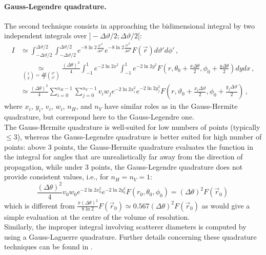 \paragraph{Gauss-Legendre quadrature.} The second technique consists in approaching the bidimensional integral by two independent integrals over $]-\Delta\vartheta/2;\Delta\vartheta/2[$:
\begin{align}
I&\simeq\int_{-\Delta\vartheta/2}^{\Delta\vartheta/2}\int_{-\Delta\vartheta/2}^{\Delta\vartheta/2}e^{-8\ln2\frac{\vartheta'^2}{\Delta\vartheta^2}}e^{-8\ln2\frac{\phi'^2}{\Delta\vartheta^2}}F(\vec r)d\vartheta'd\phi'\,,\\
&\underset{\binom xy=\frac{\Delta\theta}2\binom{\vartheta'}{\phi'}}\simeq\frac{(\Delta\theta)^2}4\int_{-1}^1 e^{-2\ln2x^2}\int_{-1}^1 e^{-2\ln2y^2}F\left(r,\theta_0+\frac{x\Delta\theta}2,\phi_0+\frac{y\Delta\theta}2\right)d yd x\,,\\
&\simeq\frac{(\Delta\theta)^2}4\sum_{i=0}^{n_H-1}\sum_{j=0}^{n_V-1}v_iw_j e^{-2\ln2x_i^2}e^{-2\ln2y_j^2}F\left(r,\vartheta_0+\frac{x_i\Delta\vartheta}2,\phi_0+\frac{y_j\Delta\vartheta}2\right)\,,
\end{align}
where $x_i$, $y_i$, $v_i$, $w_i$, $n_H$, and $n_V$ have similar roles as in the Gauss-Hermite quadrature, but correspond here to the Gauss-Legendre one.\\


The Gauss-Hermite quadrature is well-suited for low numbers of points (typically $\le3$), whereas the Gauss-Legendre quadrature is better suited for high number of points: above 3 points, the Gauss-Hermite quadrature evaluates the function in the integral for angles that are unrealistically far away from the direction of propagation, while under 3 points, the Gauss-Legendre quadrature does not provide consistent values, i.e., for $n_H=n_V=1$:
\begin{equation}
\frac{(\Delta\theta)^2}4v_0w_0 e^{-2\ln2x_0^2}e^{-2\ln2y_0^2}F\left(r_0,\theta_0,\phi_0\right)=(\Delta\theta)^2F\left(\vec r_0\right)\,
\end{equation}
which is different from $\frac{\pi(\Delta\theta)^2}{8\ln2}F\left(\vec r_0\right)\simeq0.567(\Delta\theta)^2F\left(\vec r_0\right)$ as would give a simple evaluation at the centre of the volume of resolution.\\


Similarly, the improper integral involving scatterer diameters is computed by using a Gauss-Laguerre quadrature. Further details concerning these quadrature techniques can be found in \citet{Press1992}. 


